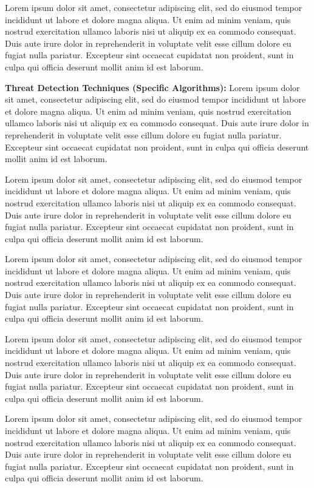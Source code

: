 \documentclass[12pt]{article}
\begin{document}
\fontsize{12}{14}\selectfont
Lorem ipsum dolor sit amet, consectetur adipiscing elit, sed do eiusmod tempor incididunt ut labore et dolore magna aliqua. Ut enim ad minim veniam, quis nostrud exercitation ullamco laboris nisi ut aliquip ex ea commodo consequat. Duis aute irure dolor in reprehenderit in voluptate velit esse cillum dolore eu fugiat nulla pariatur. Excepteur sint occaecat cupidatat non proident, sunt in culpa qui officia deserunt mollit anim id est laborum.

\textbf{Threat Detection Techniques (Specific Algorithms):} Lorem ipsum dolor sit amet, consectetur adipiscing elit, sed do eiusmod tempor incididunt ut labore et dolore magna aliqua. Ut enim ad minim veniam, quis nostrud exercitation ullamco laboris nisi ut aliquip ex ea commodo consequat. Duis aute irure dolor in reprehenderit in voluptate velit esse cillum dolore eu fugiat nulla pariatur. Excepteur sint occaecat cupidatat non proident, sunt in culpa qui officia deserunt mollit anim id est laborum.

Lorem ipsum dolor sit amet, consectetur adipiscing elit, sed do eiusmod tempor incididunt ut labore et dolore magna aliqua. Ut enim ad minim veniam, quis nostrud exercitation ullamco laboris nisi ut aliquip ex ea commodo consequat. Duis aute irure dolor in reprehenderit in voluptate velit esse cillum dolore eu fugiat nulla pariatur. Excepteur sint occaecat cupidatat non proident, sunt in culpa qui officia deserunt mollit anim id est laborum.

Lorem ipsum dolor sit amet, consectetur adipiscing elit, sed do eiusmod tempor incididunt ut labore et dolore magna aliqua. Ut enim ad minim veniam, quis nostrud exercitation ullamco laboris nisi ut aliquip ex ea commodo consequat. Duis aute irure dolor in reprehenderit in voluptate velit esse cillum dolore eu fugiat nulla pariatur. Excepteur sint occaecat cupidatat non proident, sunt in culpa qui officia deserunt mollit anim id est laborum.

Lorem ipsum dolor sit amet, consectetur adipiscing elit, sed do eiusmod tempor incididunt ut labore et dolore magna aliqua. Ut enim ad minim veniam, quis nostrud exercitation ullamco laboris nisi ut aliquip ex ea commodo consequat. Duis aute irure dolor in reprehenderit in voluptate velit esse cillum dolore eu fugiat nulla pariatur. Excepteur sint occaecat cupidatat non proident, sunt in culpa qui officia deserunt mollit anim id est laborum.

Lorem ipsum dolor sit amet, consectetur adipiscing elit, sed do eiusmod tempor incididunt ut labore et dolore magna aliqua. Ut enim ad minim veniam, quis nostrud exercitation ullamco laboris nisi ut aliquip ex ea commodo consequat. Duis aute irure dolor in reprehenderit in voluptate velit esse cillum dolore eu fugiat nulla pariatur. Excepteur sint occaecat cupidatat non proident, sunt in culpa qui officia deserunt mollit anim id est laborum.
\end{document}
